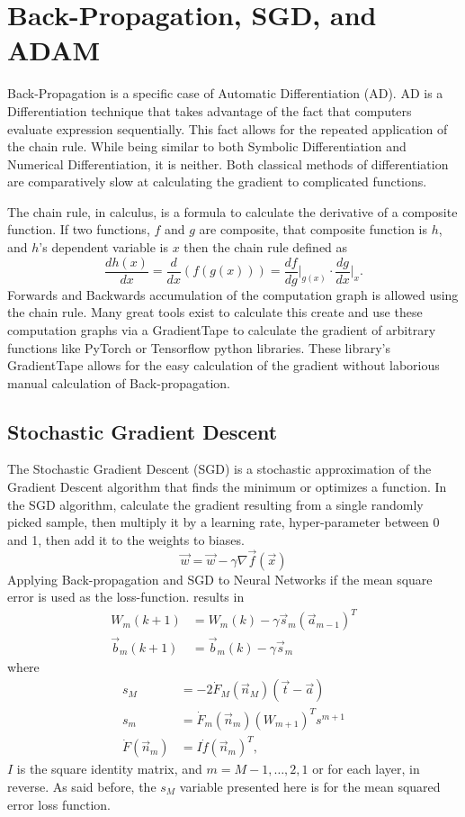 \section{Back-Propagation, SGD, and ADAM}

Back-Propagation is a specific case of Automatic Differentiation (AD). AD is a Differentiation technique that takes advantage of the fact that computers evaluate expression sequentially. This fact allows for the repeated application of the chain rule. While being similar to both Symbolic Differentiation and Numerical Differentiation, it is neither. Both classical methods of differentiation are comparatively slow at calculating the gradient to complicated functions. 

The chain rule, in calculus, is a formula to calculate the derivative of a composite function. If two functions, $f$ and $g$ are composite, that composite function is $h$, and $h$'s dependent variable is $x$ then the chain rule defined as 
$$\frac{dh(x)}{dx}=\frac{d}{dx}(f(g(x)))=\frac{df}{dg}\bigg|_{g(x)}\cdot\frac{dg}{dx}\bigg|_{x}.$$ Forwards and Backwards accumulation of the computation graph is allowed using the chain rule. Many great tools exist to calculate this create and use these computation graphs via a GradientTape to calculate the gradient of arbitrary functions like PyTorch or Tensorflow python libraries. These library's GradientTape allows for the easy calculation of the gradient without laborious manual calculation of Back-propagation.

\subsection{Stochastic Gradient Descent}

The Stochastic Gradient Descent (SGD) is a stochastic approximation of the Gradient Descent algorithm that finds the minimum or optimizes a function. In the SGD algorithm, calculate the gradient resulting from a single randomly picked sample, then multiply it by a learning rate, hyper-parameter between 0 and 1, then add it to the weights to biases. $$\vec{w}=\vec{w}-\gamma\nabla \vec{f}(\vec{x})$$ Applying Back-propagation and SGD to Neural Networks if the mean square error is used as the loss-function. results in 
\begin{align*}
W_{m}(k+1)&=W_{m}(k)-\gamma \vec{s}_m (\vec{a}_{m-1})^T\\
\vec{b}_m(k+1)&=\vec{b}_{m}(k)-\gamma \vec{s}_m
\end{align*} where
\begin{align*}
s_{M}&=-2\dot{F}_M(\vec{n}_M)(\vec{t}-\vec{a})\\
s_m&=\dot{F}_m(\vec{n}_m)(W_{m+1})^T s^{m+1}\\
\dot{F}(\vec{n}_m)&=I\dot{f}(\vec{n}_m)^T,
\end{align*} $I$ is the square identity matrix, and $m=M-1,\dots, 2, 1$ or for each layer, in reverse. As said before, the $s_M$ variable presented here is for the mean squared error loss function.

